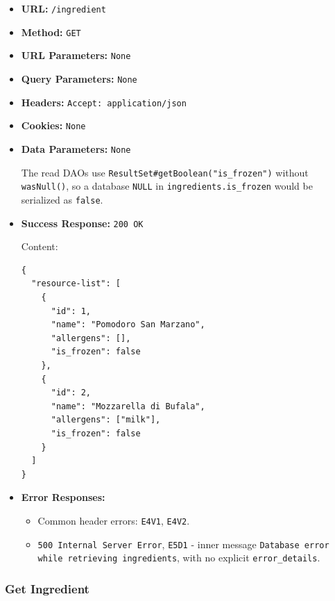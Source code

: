 \begin{itemize}[nosep]
\item \textbf{URL:} \texttt{/ingredient}

\item \textbf{Method:} \texttt{GET}

\item \textbf{URL Parameters:} \texttt{None}

\item \textbf{Query Parameters:} \texttt{None}

\item \textbf{Headers:} \texttt{Accept: application/json}

\item \textbf{Cookies:} \texttt{None}

\item \textbf{Data Parameters:} \texttt{None}

The read DAOs use \texttt{ResultSet\#getBoolean("is\_frozen")} without \texttt{wasNull()}, so a database \texttt{NULL} in \texttt{ingredients.is\_frozen} would be serialized as \texttt{false}.

\item \textbf{Success Response:} \texttt{200 OK}

Content:

\begin{lstlisting}
{
  "resource-list": [
    {
      "id": 1,
      "name": "Pomodoro San Marzano",
      "allergens": [],
      "is_frozen": false
    },
    {
      "id": 2,
      "name": "Mozzarella di Bufala",
      "allergens": ["milk"],
      "is_frozen": false
    }
  ]
}
\end{lstlisting}

\item \textbf{Error Responses:}

\begin{itemize}[nosep]
\item Common header errors: \texttt{E4V1}, \texttt{E4V2}.
\item \texttt{500 Internal Server Error}, \texttt{E5D1} - inner message \texttt{Database error while retrieving ingredients}, with no explicit \texttt{error\_details}.
\end{itemize}

\end{itemize}

\subsubsection*{Get Ingredient}

